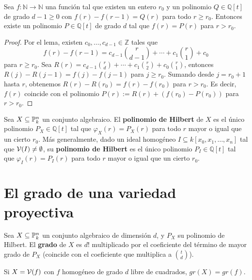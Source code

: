 \documentclass[ACGA.tex]{subfiles}
\begin{document}
\begin{coro}\label{polinomiodiff}
 Sea $f:{\mathbb N}\to{\mathbb N}$ una función tal que existen un entero $r_0$ y un polinomio $Q\in{\mathbb Q}[t]$ de grado $d-1\geq 0$ con $f(r)-f(r-1)=Q(r)$ para todo $r\geq r_0$. Entonces existe un polinomio $P\in{\mathbb Q}[t]$ de grado $d$ tal que $f(r)=P(r)$ para $r> r_0$.
\end{coro}

\begin{proof} Por el lema, existen $c_0,\ldots,c_{d-1}\in{\mathbb Z}$ tales que
$$
f(r)-f(r-1)=c_{d-1}{r\choose{d-1}}+\cdots+c_1{r\choose 1}+c_0
$$
para $r\geq r_0$. Sea $R(r)=c_{d-1}{r\choose{d}}+\cdots+c_1{r\choose 2}+c_0{r\choose 1}$, entonces $R(j)-R(j-1)=f(j)-f(j-1)$ para $j\geq r_0$. Sumando desde $j=r_0+1$ hasta $r$, obtenemos $R(r)-R(r_0)=f(r)-f(r_0)$ para $r>r_0$. Es decir, $f(r)$ coincide con el polinomio $P(r):=R(r)+(f(r_0)-P(r_0))$ para $r>r_0$.
\end{proof}

\begin{defi}
 Sea $X\subseteq\mathbb{P}^n_k$ un conjunto algebraico. El {\bf polinomio de Hilbert} de $X$ es el único polinomio $P_X\in{\mathbb Q}[t]$ tal que $\varphi_X(r)=P_X(r)$ para todo $r$ mayor o igual que un cierto $r_0$. Más generalmente, dado un ideal homogéneo $I\subseteq k[x_0,x_1,\ldots,x_n]$ tal que $\mathcal{V}(I)\neq\emptyset$, su {\bf polinomio de Hilbert} es el único polinomio $P_I\in{\mathbb Q}[t]$ tal que $\varphi_I(r)=P_I(r)$ para todo $r$ mayor o igual que un cierto $r_0$.
\end{defi}

\section{El grado de una variedad proyectiva}

\begin{defi}
 Sea $X\subseteq\mathbb{P}^n_k$ un conjunto algebraico de dimensión $d$, y $P_X$ su polinomio de Hilbert. El {\bf grado} de $X$ es $d!$ multiplicado por el coeficiente del término de mayor grado de $P_X$ (coincide con el coeficiente que multiplica a $\binom{t}{d}$).
\end{defi}

\begin{prop}
Si $X=\mathcal{V}(f)$ con $f$ homogéneo de grado $d$ libre de cuadrados, $gr(X)=gr(f)$. 
\end{prop}
\end{document}
